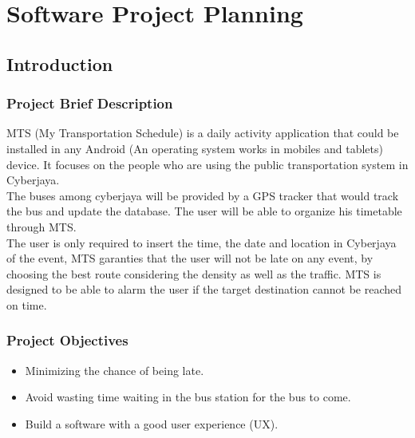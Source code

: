 \chapter{Software Project Planning} 

\label{Chapter1} 


\doublespacing


\section{Introduction}

\subsection{Project Brief Description}
MTS (My Transportation Schedule) is a daily activity application that could be installed in any Android (An operating system works in mobiles and tablets) device. It focuses on the people who are using the public transportation system in Cyberjaya.\\

The buses among cyberjaya will be provided by a GPS tracker that would track the bus and update the database. The user will be able to organize his timetable through MTS.\\ 

The user is only required to insert the time, the date and location in Cyberjaya of the event, MTS garanties that the user will not be late on any event, by choosing the best route considering the density as well as the traffic. MTS is designed to be able to alarm the user if the target destination cannot be reached on time.

\subsection{Project Objectives}
\begin{itemize}
	\item Minimizing the chance of being late. 
	\item Avoid wasting time waiting in the bus station for the bus to come.
	\item Build a software with a good user experience (UX).
\end{itemize}


